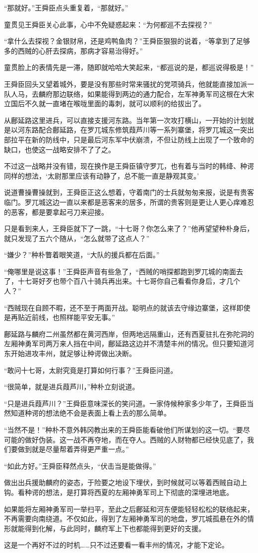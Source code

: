 “那就好。”王舜臣点头重复着，“那就好。”

童贯见王舜臣关心此事，心中不免疑惑起来：“为何都巡不去探视？”

“拿什么去探视？金银财帛，还是鸡鸭鱼肉？”王舜臣狠狠的说着，“等拿到了足够多的西贼的心肝去探病，那病才容易治得好。”

童贯脸上的表情先是一滞，随即就哈哈大笑起来，“都巡说的是，都巡说得极是！”

王舜臣回头又望着城外，要是没有那些时常来骚扰的党项骑兵，他就能直接加派一队人马，去麟府那边联络，如果能得到两边的通力配合，左军神勇军司这根在大宋立国后不久就一直堵在喉咙里面的毒刺，就可以顺利的给拔出了。

从鄜延路这里进兵，可以直接支援河东路。当年第一次攻打横山，一开始的计划就是以河东路配合鄜延路，在罗兀城东修筑葭芦川等一系列寨堡，将罗兀城这一突出部拉平在新的防线中，只是最后河东军中伏崩溃，不但让防线上出现了一个致命的缺口，也使这一战略安排不了了之。

不过这一战略并没有错，现在换作是王舜臣镇守罗兀，也有着与当时的韩绛、种谔同样的想法，‘太尉那里应该有动静了，总不能一直是静观其变。’

说道曹操曹操就到，王舜臣正这么想着，守着南门的士兵就匆匆来报，说是有贵客临门。罗兀城这边一直以来都是恶客来的居多，所谓的贵客则是更让人更心痒难忍的恶客，都是要拿起弓刀来迎接。

只是看到来人，王舜臣就下了一跳，“十七哥？你怎么来了？”他再望望种朴身后，就只发现了五六个随从，“怎么就带了这点人？”

“嫌少？”种朴瞥着眼笑道，“大队的援兵都在后面。”

“俺哪里是说这事！”王舜臣声音有些急了，“西贼的哨探都跑到罗兀城的南面去了，十七哥好歹也带个百八十骑兵再出来。十七哥你自己看看你身后，才几个人？”

“西贼现在自顾不暇，还不至于两面开战。聪明点的就该去守缘边寨堡，这样即使是再贴近前线，也照样能平安无事。”

鄜延路与麟府二州虽然都在黄河西岸，但两地远隔重山，还有西夏驻扎在弥陀洞的左厢神勇军司两万来人挡在中间，鄜延路这边并不清楚丰州的情况。但只要知道河东开始进攻丰州，就足够让种谔做出决断。

“敢问十七哥，太尉究竟是打算如何行事？”王舜臣问道。

“很简单，就是进兵葭芦川，”种朴立刻说道。

“只是进兵葭芦川？”王舜臣意味深长的笑问道。一家侍候种家多少年了，王舜臣当然知道种谔的想法绝不会是表面上看上去的那么简单。

“当然不是！”种朴不意外韩冈教出来的王舜臣能看破他们所谋划的这一切。“要尽可能的做好伪装。这一战不再夺地，而在夺人。西贼的人财物都已经快见底了，我们要做到就是尽量帮着弄得更严重一点。”

“如此方好。”王舜臣释然点头，“伏击当是能做得。”

做出出兵援助麟府的姿态，于险要之地设下埋伏，到时候就可以等着西贼自动上钩。看种谔的想法，是打算将西夏的左厢神勇军司上下彻底的深埋进地底。

如果能将左厢神勇军司一举扫平，至此之后鄜延和河东便能轻轻松松的联络起来，不再需要向南绕道。不仅如此，得到了左厢神勇军司的地盘，罗兀城孤悬在外的情形就能得到化解，与此同时，麟府军上下也都能得到更好的支援。

这是一个再好不过的时机……只不过还要看一看丰州的情况，才能下定论。

